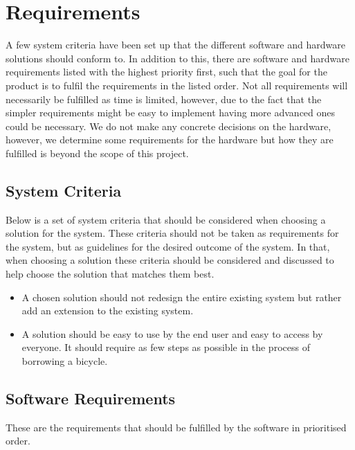 \section{Requirements}
A few system criteria have been set up that the different software and hardware solutions should conform to. 
In addition to this, there are software and hardware requirements listed with the highest priority first, such that the goal for the product is to fulfil the requirements in the listed order. 
Not all requirements will necessarily be fulfilled as time is limited, however, due to the fact that the simpler requirements might be easy to implement having more advanced ones could be necessary.
We do not make any concrete decisions on the hardware, however, we determine some requirements for the hardware but how they are fulfilled is beyond the scope of this project.

\subsection{System Criteria}
Below is a set of system criteria that should be considered when choosing a solution for the system.
These criteria should not be taken as requirements for the system, but as guidelines for the desired outcome of the system.
In that, when choosing a solution these criteria should be considered and discussed to help choose the solution that matches them best.

\begin{itemize}
	\item A chosen solution should not redesign the entire existing system but rather add an extension to the existing system.
	\item A solution should be easy to use by the end user and easy to access by everyone. 
	It should require as few steps as possible in the process of borrowing a bicycle.
\end{itemize}

\subsection{Software Requirements}
These are the requirements that should be fulfilled by the software in prioritised order.

